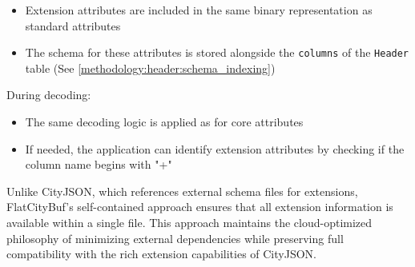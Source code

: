 \begin{itemize}
  \item Extension attributes are included in the same binary representation as standard attributes
  \item The schema for these attributes is stored alongside the \texttt{columns} of the \texttt{Header} table (See \autoref{methodology:header:schema_indexing})
\end{itemize}

During decoding:
\begin{itemize}
  \item The same decoding logic is applied as for core attributes
  \item If needed, the application can identify extension attributes by checking if the column name begins with "+"
\end{itemize}

Unlike CityJSON, which references external schema files for extensions, FlatCityBuf's self-contained approach ensures that all extension information is available within a single file. This approach maintains the cloud-optimized philosophy of minimizing external dependencies while preserving full compatibility with the rich extension capabilities of CityJSON.
